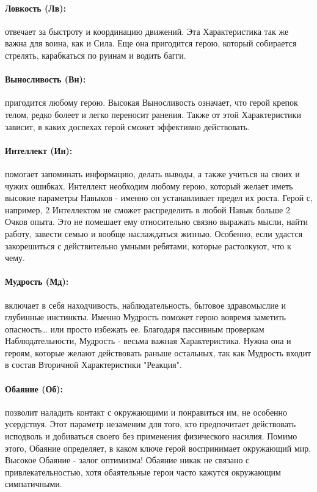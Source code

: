\paragraph{Ловкость (Лв):} отвечает за быстроту и координацию движений. Эта Характеристика так же важна для воина, как и Сила. Еще она пригодится герою, который собирается стрелять, карабкаться по руинам и водить багги.

\paragraph{Выносливость (Вн):} пригодится любому герою. Высокая Выносливость означает, что герой крепок телом, редко болеет и легко переносит ранения. Также от этой Характеристики зависит, в каких доспехах герой сможет эффективно действовать.

\paragraph{Интеллект (Ин):} помогает запоминать информацию, делать выводы, а также учиться на своих и чужих ошибках. Интеллект необходим любому герою, который желает иметь высокие параметры Навыков - именно он устанавливает предел их роста.
\newline Герой с, например, 2 Интеллектом не сможет распределить в любой Навык больше 2 Очков опыта. Это не помешает ему относительно связно выражать мысли, найти работу, завести семью и вообще наслаждаться жизнью. Особенно, если удастся закорешиться с действительно умными ребятами, которые растолкуют, что к чему. 

\paragraph{Мудрость (Мд):} включает в себя находчивость, наблюдательность, бытовое здравомыслие и глубинные инстинкты. Именно Мудрость поможет герою вовремя заметить опасность… или просто избежать ее.
\newline Благодаря пассивным проверкам Наблюдательности, Мудрость - весьма важная Характеристика. Нужна она и героям, которые желают действовать раньше остальных, так как Мудрость входит в состав Вторичной Характеристики "Реакция".

\paragraph{Обаяние (Об):} позволит наладить контакт с окружающими и понравиться им, не особенно усердствуя. Этот параметр незаменим для того, кто предпочитает действовать исподволь и добиваться своего без применения физического насилия. Помимо этого, Обаяние определяет, в каком ключе герой воспринимает окружающий мир. Высокое Обаяние - залог оптимизма!
\newline Обаяние никак не связано с привлекательностью, хотя обаятельные герои часто кажутся окружающим симпатичными. 

